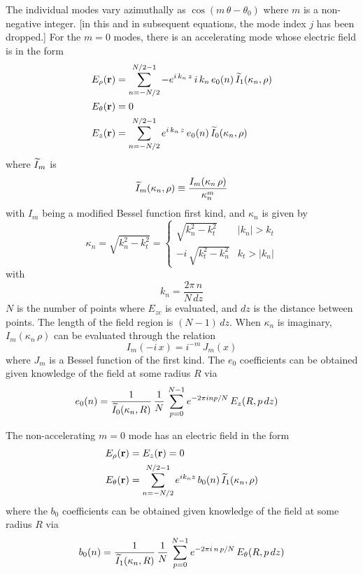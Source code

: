The individual modes vary azimuthally as $\cos(m \, \theta - \theta_0)$ where $m$ is a non-negative
integer.  [in this and in subsequent equations, the mode index $j$ has been dropped.]  For the $m =
0$ modes, there is an accelerating mode whose electric field is in the form
\begin{align}
  E_\rho({\bf r}) &= \sum_{n=-N/2}^{N/2-1} -e^{i \, k_n \, z} \, 
    i \, k_n \, e_0(n) \, \widetilde I_1(\kappa_n, \rho) \nonumber \\
  E_\theta({\bf r}) &= 0 \\
  E_z({\bf r}) &= \sum_{n=-N/2}^{N/2-1}e^{i \, k_n \, z} \, 
    e_0(n) \, \widetilde I_0(\kappa_n, \rho) \nonumber
\end{align}
where $\widetilde I_m$ is
\begin{equation}
  \widetilde I_m (\kappa_n, \rho) \equiv \frac{I_m(\kappa_n \, \rho)}{\kappa_n^m}
\end{equation}
with $I_m$ being a modified Bessel function first kind, and $\kappa_n$ is given by
\begin{equation}
  \kappa_n = \sqrt{k_n^2 - k_t^2} = 
  \begin{cases}
    \sqrt{k_n^2 - k_t^2} & |k_n| > k_t \\
    -i \, \sqrt{k_t^2 - k_n^2} & k_t > |k_n|
  \end{cases}
\end{equation}
with
\begin{equation}
  k_n = \frac{2 \pi \, n}{N \, dz}
\end{equation}
$N$ is the number of points where $E_{zc}$ is evaluated, and $dz$ is
the distance between points. The length of the field region is $(N-1) \, dz$. When
$\kappa_n$ is imaginary, $I_m(\kappa_n \, \rho)$ can be evaluated
through the relation
\begin{equation}
  I_m(-i \, x) = i^{-m} \, J_m(x)
\end{equation}
where $J_m$ is a Bessel function of the first kind.
The $e_0$ coefficients can be obtained given knowledge of the field at some radius $R$ via
\begin{align}
  e_0(n) &= \frac{1}{\widetilde I_0(\kappa_n, R)} \, \frac{1}{N} \, \sum_{p=0}^{N-1}
    e^{-2 \pi i n p / N} \, E_{z}(R, p \, dz)
\end{align}

The non-accelerating $m = 0$ mode has an electric field in the form
\begin{align}
  E_\rho({\bf r}) &= E_z({\bf r}) = 0 \nonumber \\
  E_\theta({\bf r}) &= \sum_{n=-N/2}^{N/2-1}e^{i k_n z} \, 
    b_0(n) \, \widetilde I_1(\kappa_n, \rho)
\end{align}
where the $b_0$ coefficients can be obtained given knowledge of the field at some radius $R$ via
\begin{equation}
  b_0(n) = \frac{1}{\widetilde I_1(\kappa_n, R)} \, \frac{1}{N} \, \sum_{p=0}^{N-1}
    e^{-2 \pi i \, n \, p / N} \, E_{\theta}(R, p \, dz)
\end{equation}

